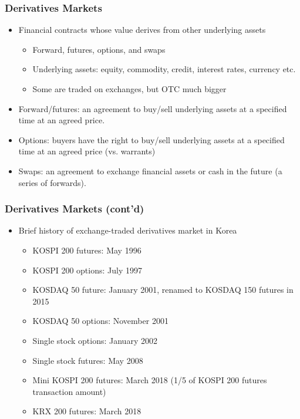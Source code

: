 \documentclass[10pt]{beamer}
\begin{document}
	
	\begin{frame}
		\frametitle{Derivatives Markets}
		
		\begin{itemize} \vspace{5pt} \itemsep10pt
			\item Financial contracts whose value derives from other underlying assets
			\begin{itemize} 
				\item Forward, futures, options, and swaps
				\item Underlying assets: equity, commodity, credit, interest rates, currency etc.
				\item Some are traded on exchanges, but OTC much bigger
			\end{itemize}
			\item Forward/futures: an agreement to buy/sell underlying assets at a specified time at an agreed price.
			\item Options: buyers have the right to buy/sell underlying assets at a specified time at an agreed price (vs. warrants)
			\item Swaps: an agreement to exchange financial assets or cash in the future (a series of forwards).
		\end{itemize}
		
	\end{frame}
	
	
	
	
	\begin{frame}
		\frametitle{Derivatives Markets (cont'd)}
		
		\begin{itemize}
			\item Brief history of exchange-traded derivatives market in Korea
			\begin{itemize} \itemsep7pt
				\item KOSPI 200 futures: May 1996
				\item KOSPI 200 options: July 1997
				\item KOSDAQ 50 future: January 2001, renamed to KOSDAQ 150 futures in 2015
				\item KOSDAQ 50 options: November 2001
				
				\item Single stock options: January 2002
				\item Single stock futures: May 2008
				
				
				\item Mini KOSPI 200 futures: March 2018 (1/5 of KOSPI 200 futures transaction amount)
				\item KRX 200 futures: March 2018
				
			\end{itemize}
			
		\end{itemize}
		
	\end{frame}
	
\end{document}
